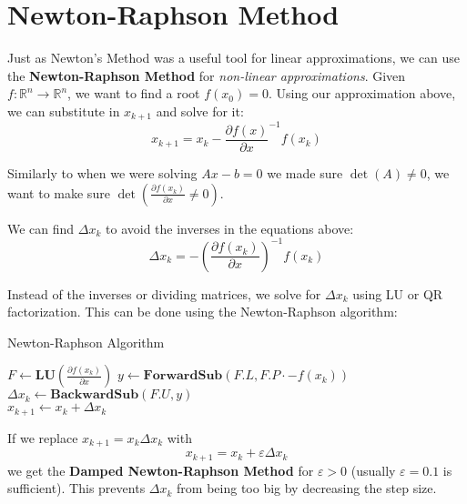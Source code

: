\section{Newton-Raphson Method}

Just as Newton's Method was a useful tool for linear approximations, we can use the \textbf{Newton-Raphson Method} for \emph{non-linear approximations}. Given \(f: \mathbb{R}^n \to \mathbb{R}^n\), we want to find a root \(f(x_0) = 0\). Using our approximation above, we can substitute in \(x_{k+1}\) and solve for it:
\[
  x_{k+1} = x_k - \frac{\partial f(x)}{\partial x}^{-1} f(x_k)
\]

\begin{remark}
  Similarly to when we were solving \(Ax - b = 0\) we made sure \(\det (A) \neq 0\), we want to make sure \(\det (\frac{\partial f(x_k)}{\partial x} \neq 0)\).
\end{remark}

We can find \(\Delta x_k\) to avoid the inverses in the equations above:
\[
  \Delta x_k = - \left( \frac{\partial f(x_k)}{\partial x}  \right)^{-1} f(x_k)
\]

  Instead of the inverses or dividing matrices, we solve for \(\Delta x_k\) using LU or QR factorization. This can be done using the Newton-Raphson algorithm:

\begin{algorithm}
  \DontPrintSemicolon
  \caption{Newton-Raphson Algorithm}
  \(F \gets \mathbf{LU} \left( \frac{\partial f(x_k)}{\partial x}  \right) \) 
  \(y \gets \mathbf{ForwardSub} \left( F.L, F.P \cdot -f(x_k) \right) \) \\
  \(\Delta x_k \gets \mathbf{BackwardSub} \left( F.U, y \right) \) \\
  \(x_{k + 1} \gets x_k + \Delta x_k \) 
\end{algorithm}

If we replace \(x_{k+1} = x_k \Delta x_k \) with
\[
  x_{k+1} = x_k + \varepsilon \Delta x_k
\]
we get the \textbf{Damped Newton-Raphson Method} for \(\varepsilon > 0\) (usually \(\varepsilon = 0.1\) is sufficient). This prevents \(\Delta x_k\) from being too big by decreasing the step size.